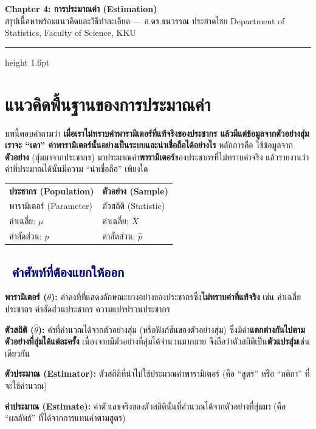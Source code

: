 \documentclass[10pt]{extarticle}
\newcommand{\dist}[1]{\subsection*{\textcolor{navy}{\textbullet\ #1}}}
\begin{document}
\begin{center}
{\LARGE\bfseries\color{navy} Chapter 4: การประมาณค่า (Estimation)}\\[3pt]
{\normalsize สรุปเนื้อหาพร้อมแนวคิดและวิธีทำละเอียด — อ.ดร.ธนวรรณ ประฮาดไชย \quad Department of Statistics, Faculty of Science, KKU}
\end{center}
\vspace{3pt}
{\color{gold}\hrule height 1.6pt}
\vspace{6pt}

\section{แนวคิดพื้นฐานของการประมาณค่า}

บทนี้ตอบคำถามว่า \textbf{เมื่อเราไม่ทราบค่าพารามิเตอร์ที่แท้จริงของประชากร แล้วมีแต่ข้อมูลจากตัวอย่างสุ่ม เราจะ ``เดา'' ค่าพารามิเตอร์นั้นอย่างเป็นระบบและน่าเชื่อถือได้อย่างไร} หลักการคือ ใช้ข้อมูลจาก\textbf{ตัวอย่าง} (สุ่มมาจากประชากร) มาประมาณค่า\textbf{พารามิเตอร์}ของประชากรที่ไม่ทราบค่าจริง แล้วรายงานว่าค่าที่ประมาณได้นั้นมีความ ``น่าเชื่อถือ'' เพียงใด

\begin{center}
\begin{tabular}{@{}ll@{}}
\rowcolor{lightbg}\textbf{ประชากร (Population)} & \textbf{ตัวอย่าง (Sample)}\\
พารามิเตอร์ (Parameter) & ตัวสถิติ (Statistic)\\
ค่าเฉลี่ย: $\mu$ & ค่าเฉลี่ย: $\bar{X}$\\
ค่าสัดส่วน: $p$ & ค่าสัดส่วน: $\hat{p}$\\
\end{tabular}
\end{center}

\dist{คำศัพท์ที่ต้องแยกให้ออก}
\textbf{พารามิเตอร์ ($\theta$):} ค่าคงที่ที่แสดงลักษณะบางอย่างของประชากรซึ่ง\textbf{ไม่ทราบค่าที่แท้จริง} เช่น ค่าเฉลี่ยประชากร ค่าสัดส่วนประชากร ความแปรปรวนประชากร

\textbf{ตัวสถิติ ($\hat\theta$):} ค่าที่คำนวณได้จากตัวอย่างสุ่ม (หรือฟังก์ชันของตัวอย่างสุ่ม) ซึ่งมีค่า\textbf{แตกต่างกันไปตามตัวอย่างที่สุ่มได้แต่ละครั้ง} เนื่องจากมีตัวอย่างที่สุ่มได้จำนวนมากมาย จึงถือว่าตัวสถิติเป็น\textbf{ตัวแปรสุ่ม}เช่นเดียวกัน

\textbf{ตัวประมาณ (Estimator):} ตัวสถิติที่นำไปใช้ประมาณค่าพารามิเตอร์ (คือ ``สูตร'' หรือ ``กติกา'' ที่จะใช้คำนวณ)

\textbf{ค่าประมาณ (Estimate):} ค่าตัวเลขจริงของตัวสถิตินั้นที่คำนวณได้จากตัวอย่างที่สุ่มมา (คือ ``ผลลัพธ์'' ที่ได้จากการแทนค่าตามสูตร)
\end{document}
